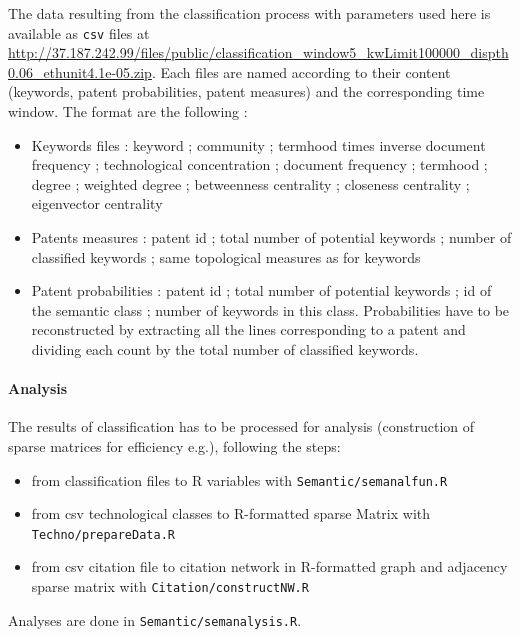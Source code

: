 \documentclass[12pt,twoside,a4paper]{article}
\begin{document}
The data resulting from the classification process with parameters used here is available as \texttt{csv} files at \url{http://37.187.242.99/files/public/classification_window5_kwLimit100000_dispth0.06_ethunit4.1e-05.zip}. Each files are named according to their content (keywords, patent probabilities, patent measures) and the corresponding time window. The format are the following :

\begin{itemize}
\item Keywords files : keyword ; community ; termhood times inverse document frequency ; technological concentration ; document frequency ; termhood ; degree ; weighted degree ; betweenness centrality ; closeness centrality ; eigenvector centrality
\item Patents measures : patent id ; total number of potential keywords ; number of classified keywords ; same topological measures as for keywords
\item Patent probabilities : patent id ; total number of potential keywords ; id of the semantic class ; number of keywords in this class. Probabilities have to be reconstructed by extracting all the lines corresponding to a patent and dividing each count by the total number of classified keywords.
\end{itemize}




\paragraph{Analysis}

The results of classification has to be processed for analysis (construction of sparse matrices for efficiency e.g.), following the steps:
\begin{itemize}
\item from classification files to R variables with \texttt{Semantic/semanalfun.R}
\item from csv technological classes to R-formatted sparse Matrix with \texttt{Techno/prepareData.R} 
\item from csv citation file to citation network in R-formatted graph and adjacency sparse matrix with \texttt{Citation/constructNW.R}
\end{itemize}

Analyses are done in \texttt{Semantic/semanalysis.R}.



\newpage
\end{document}
